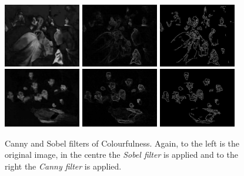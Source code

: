 \documentclass[11pt,a4paper,twoside,openright]{report}
\begin{document}
\begin{figure}[tbp]
\centering
\includegraphics[width=0.30\textwidth]{CS_caravaggio_1962_139_1}
\includegraphics[width=0.30\textwidth]{sobel_CS_caravaggio_1962_139_1}
\includegraphics[width=0.30\textwidth]{canny_CS_caravaggio_1962_139_1}
\includegraphics[width=0.30\textwidth]{CS_rembrandt_eu_464}
\includegraphics[width=0.30\textwidth]{sobel_CS_rembrandt_eu_464}
\includegraphics[width=0.30\textwidth]{canny_CS_rembrandt_eu_464}
\caption[Canny and Sobel filters of Colourfulness]{Canny and Sobel filters of
Colourfulness.  Again, to the left is the original image, in the centre the
\emph{Sobel filter} is applied and to the right the \emph{Canny filter} is
applied.}
\label{fig:cannysobelcs}
\end{figure}
\end{document}
